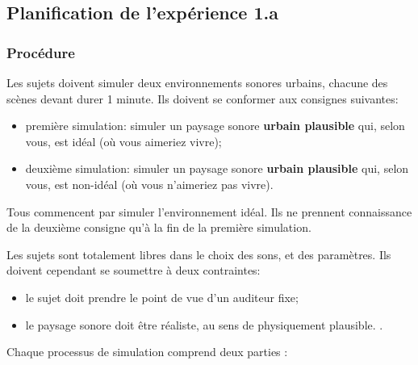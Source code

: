 \documentclass[twoside,twocolumn]{article}
\begin{document}
\subsection{Planification de l'expérience 1.a}
\label{sec:xp1a_plan}

\subsubsection*{Procédure} 

Les sujets doivent simuler deux environnements sonores urbains, chacune des scènes devant durer 1 minute. Ils doivent se conformer aux consignes suivantes:

\begin{itemize}
\item première simulation: simuler un paysage sonore \textbf{urbain plausible} qui, selon vous, est idéal (où vous aimeriez vivre);
\item deuxième simulation: simuler un paysage sonore \textbf{urbain plausible} qui, selon vous, est non-idéal (où vous n'aimeriez pas vivre).
\end{itemize}

Tous commencent par simuler l'environnement idéal. Ils ne prennent connaissance de la deuxième consigne qu'à la fin de la première simulation.

Les sujets sont totalement libres dans le choix des sons, et des paramètres. Ils doivent cependant se soumettre à deux contraintes:

\begin{itemize}
\item le sujet doit prendre le point de vue d’un auditeur fixe;
\item le paysage sonore doit être réaliste, au sens de physiquement plausible.  .
\end{itemize}


Chaque processus de simulation comprend deux parties :
\end{document}
